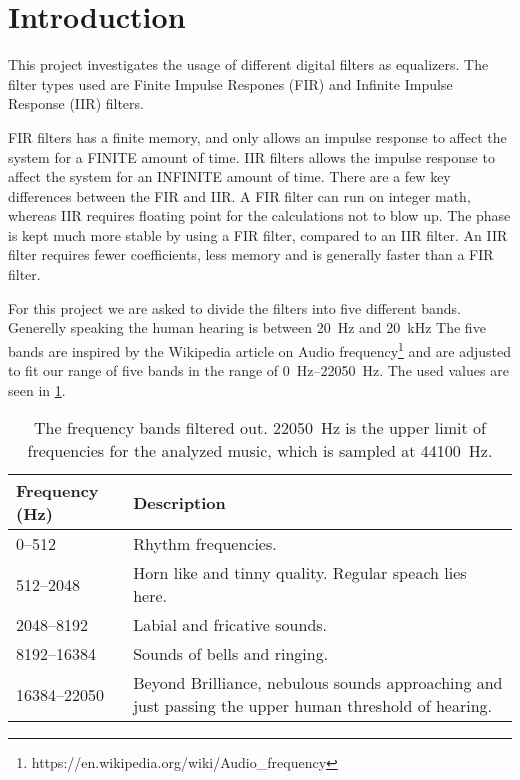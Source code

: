 
\section{Introduction}
This project investigates the usage of different digital filters as equalizers. The filter types used are Finite Impulse Respones (FIR) and Infinite Impulse Response (IIR) filters.

FIR filters has a finite memory, and only allows an impulse response to affect the system for a FINITE amount of time.
IIR filters allows the impulse response to affect the system for an INFINITE amount of time.
There are a few key differences between the FIR and IIR.
A FIR filter can run on integer math, whereas IIR requires floating point for the calculations not to blow up. The phase is kept much more stable by using a FIR filter, compared to an IIR filter.
An IIR filter requires fewer coefficients, less memory and is generally faster than a FIR filter.

For this project we are asked to divide the filters into five different bands. Generelly speaking the human hearing is between \SI{20}{\hertz} and \SI{20}{\kilo\hertz} The five bands are inspired by the Wikipedia article on Audio frequency\footnote{https://en.wikipedia.org/wiki/Audio\_frequency} and are adjusted to fit our range of five bands in the range of \SIrange{0}{22050}{\hertz}. The used values are seen in \cref{tab:FiveBand}.

\begin{table}[h]
	\caption{The frequency bands filtered out. \SI{22050}{\hertz} is the upper limit of frequencies for the analyzed music, which is sampled at \SI{44100}{\hertz}.}
	\label{tab:FiveBand}
	\begin{tabularx}{\textwidth}{X X}
		\textbf{Frequency} (\si{\hertz})	& \textbf{Description} \\
		\toprule
		\numrange{0}{512}		& Rhythm frequencies. \\
		\numrange{512}{2048}	& Horn like and tinny quality. Regular speach lies here. \\
		\numrange{2048}{8192}	& Labial and fricative sounds. \\
		\numrange{8192}{16384}	& Sounds of bells and ringing. \\
		\numrange{16384}{22050} & 	Beyond Brilliance, nebulous sounds approaching and just passing the upper human threshold of hearing. \\
	\end{tabularx}
\end{table}

